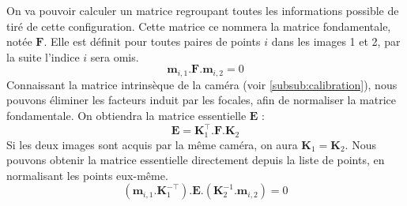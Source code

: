 On va pouvoir calculer un matrice regroupant toutes les informations possible de tiré de cette configuration.
Cette matrice ce nommera la matrice fondamentale, notée $\mathbf{F}$.
Elle est définit pour toutes paires de points $i$ dans les images 1 et 2, par la suite l'indice $i$ sera omis.
\begin{equation}
\mathbf{m}_{i,1}.\mathbf{F}.\mathbf{m}_{i,2} = 0
\label{eq:fondamentale}
\end{equation}
Connaissant la matrice intrinsèque de la caméra (voir \ref{subsub:calibration}), nous pouvons éliminer les facteurs induit par les focales, afin de normaliser la matrice fondamentale.
On obtiendra la matrice essentielle $\mathbf{E}$ :
\begin{equation}
\mathbf{E} = \mathbf{K}_1^{\top} . \mathbf{F} . \mathbf{K}_2
\end{equation}
Si les deux images sont acquis par la même caméra, on aura $\mathbf{K}_1 = \mathbf{K}_2$.
Nous pouvons obtenir la matrice essentielle directement depuis la liste de points, en normalisant les points eux-même.
\begin{equation}
(\mathbf{m}_{i,1}.\mathbf{K}_1^{-\top}).\mathbf{E}.(\mathbf{K}_2^{-1}.\mathbf{m}_{i,2}) = 0
\label{eq:essentielle}
\end{equation}



